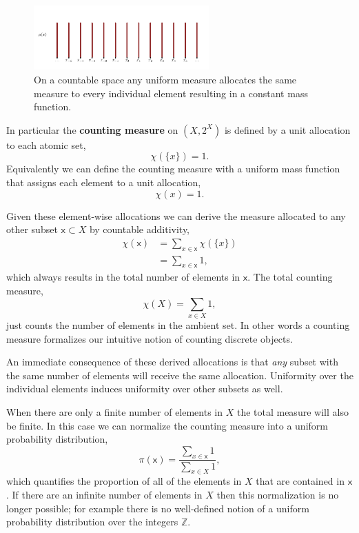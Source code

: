 \documentclass[
  letterpaper,
  DIV=11,
  numbers=noendperiod]{scrartcl}
\begin{document}
\begin{figure}

{\centering \includegraphics[width=0.6\textwidth,height=\textheight]{figures/uniform_mass_function/uniform_mass_function.pdf}

}

\caption{\label{fig-uniform-mass-function}On a countable space any
uniform measure allocates the same measure to every individual element
resulting in a constant mass function.}

\end{figure}

In particular the \textbf{counting measure} on \((X, 2^{X})\) is defined
by a unit allocation to each atomic set, \[
\chi(\{ x \}) = 1.
\] Equivalently we can define the counting measure with a uniform mass
function that assigns each element to a unit allocation, \[
\chi(x) = 1.
\]

Given these element-wise allocations we can derive the measure allocated
to any other subset \(\mathsf{x} \subset X\) by countable additivity,
\begin{align*}
\chi( \mathsf{x} )
&= \sum_{x \in \mathsf{x}} \chi(\{ x \})
\\
&= \sum_{x \in \mathsf{x}} 1,
\end{align*} which always results in the total number of elements in
\(\mathsf{x}\). The total counting measure, \[
\chi( X ) = \sum_{x \in X} 1,
\] just counts the number of elements in the ambient set. In other words
a counting measure formalizes our intuitive notion of counting discrete
objects.

An immediate consequence of these derived allocations is that \emph{any}
subset with the same number of elements will receive the same
allocation. Uniformity over the individual elements induces uniformity
over other subsets as well.

When there are only a finite number of elements in \(X\) the total
measure will also be finite. In this case we can normalize the counting
measure into a uniform probability distribution, \[
\pi ( \mathsf{x} ) =
\frac{ \sum_{x \in \mathsf{x}} 1 }{ \sum_{x \in X} 1 },
\] which quantifies the proportion of all of the elements in \(X\) that
are contained in \(\mathsf{x}\). If there are an infinite number of
elements in \(X\) then this normalization is no longer possible; for
example there is no well-defined notion of a uniform probability
distribution over the integers \(\mathbb{Z}\).
\end{document}
